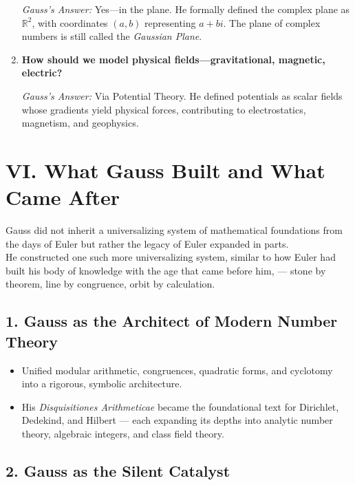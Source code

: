 \documentclass[9pt]{article}
\begin{document}
\begin{enumerate}
  \textit{Gauss’s Answer:} Yes—in the plane.  
  He formally defined the complex plane as \(\mathbb{R}^2\), with coordinates \( (a, b) \) representing \( a + bi \).  
  The plane of complex numbers is still called the \textit{Gaussian Plane}.

  \item \textbf{How should we model physical fields—gravitational, magnetic, electric?}

  \textit{Gauss’s Answer:} Via Potential Theory.  
  He defined potentials as scalar fields whose gradients yield physical forces, contributing to electrostatics, magnetism, and geophysics.

\end{enumerate}

\newpage

\section*{VI. What Gauss Built and What Came After}

\noindent
Gauss did not inherit a universalizing system of mathematical foundations from the days of Euler but rather the legacy of Euler expanded in parts.\\

\noindent
He constructed one such more universalizing system, similar to how Euler had built his body of knowledge with the age that came before him, — stone by theorem, line by congruence, orbit by calculation.

\vspace{1em}

\subsection*{1. Gauss as the Architect of Modern Number Theory}

\begin{itemize}
  \item Unified modular arithmetic, congruences, quadratic forms, and cyclotomy into a rigorous, symbolic architecture.
  \item His \textit{Disquisitiones Arithmeticae} became the foundational text for Dirichlet, Dedekind, and Hilbert — each expanding its depths into analytic number theory, algebraic integers, and class field theory.
\end{itemize}

\vspace{1em}

\subsection*{2. Gauss as the Silent Catalyst}
\end{document}
